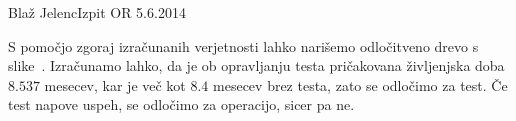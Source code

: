 \begin{naloga}{Blaž Jelenc}{Izpit OR 5.6.2014}
\begin{odgovor}
\begin{enumerate}[(a)]
S pomočjo zgoraj izračunanih verjetnosti
lahko narišemo odločitveno drevo s slike~\fig.
Izračunamo lahko, da je ob opravljanju testa
pričakovana življenjska doba $8.537$ mesecev,
kar je več kot $8.4$ mesecev brez testa,
zato se odločimo za test.
Če test napove uspeh, se odločimo za operacijo, sicer pa ne.
\end{enumerate}

\begin{slika}
\makebox[\textwidth][c]{
\pgfslika
}
\end{slika}
\end{odgovor}
\end{naloga}

